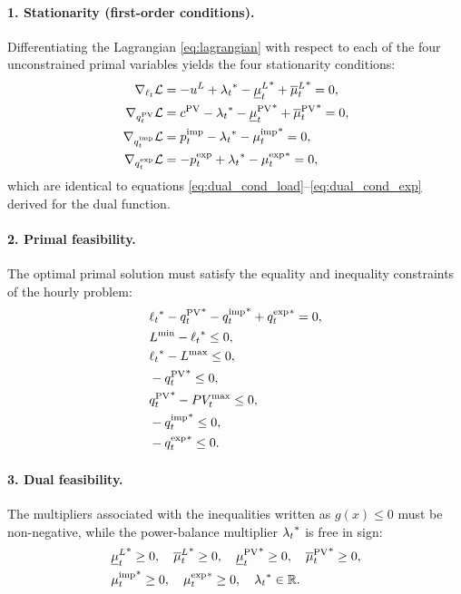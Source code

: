 \paragraph{1. Stationarity (first-order conditions).}
Differentiating the Lagrangian \eqref{eq:lagrangian} with respect to each of the four
unconstrained primal variables yields the four stationarity conditions:
\begin{align}
    \nabla_{\ell_{t}} \mathcal{L} &= -u^{L} + {\lambda_{t}}^* - {\underline{\mu}^{L}_{t}}^* + {\overline{\mu}^{L}_{t}}^* = 0, \label{eq:kkt_stat_load} \\
    \nabla_{q^{\mathrm{PV}}_{t}} \mathcal{L} &= c^{\mathrm{PV}} - {\lambda_{t}}^* - {\underline{\mu}^{\mathrm{PV}}_{t}}^* + {\overline{\mu}^{\mathrm{PV}}_{t}}^* = 0, \label{eq:kkt_stat_pv} \\
    \nabla_{q^{\mathrm{imp}}_{t}} \mathcal{L} &= p^{\mathrm{imp}}_{t} - {\lambda_{t}}^* - {\mu^{\mathrm{imp}}_{t}}^* = 0, \label{eq:kkt_stat_imp} \\
    \nabla_{q^{\mathrm{exp}}_{t}} \mathcal{L} &= -p^{\mathrm{exp}}_{t} + {\lambda_{t}}^* - {\mu^{\mathrm{exp}}_{t}}^* = 0, \label{eq:kkt_stat_exp}
\end{align}
which are identical to equations \eqref{eq:dual_cond_load}--\eqref{eq:dual_cond_exp} derived for
the dual function.

\paragraph{2. Primal feasibility.}
The optimal primal solution must satisfy the equality and inequality constraints of the
hourly problem:
\begin{align}
    & {\ell_{t}}^* - {q^{\mathrm{PV}}_{t}}^* - {q^{\mathrm{imp}}_{t}}^* + {q^{\mathrm{exp}}_{t}}^* = 0, \label{eq:kkt_pf_bal} \\
    & L^{\min} - {\ell_{t}}^* \leq 0, \label{eq:kkt_pf_load_lb} \\
    & {\ell_{t}}^* - L^{\max} \leq 0, \label{eq:kkt_pf_load_ub} \\
    & -{q^{\mathrm{PV}}_{t}}^* \leq 0, \label{eq:kkt_pf_pv_lb} \\
    & {q^{\mathrm{PV}}_{t}}^* - PV_{t}^{\max} \leq 0, \label{eq:kkt_pf_pv_ub} \\
    & -{q^{\mathrm{imp}}_{t}}^* \leq 0, \label{eq:kkt_pf_imp} \\
    & -{q^{\mathrm{exp}}_{t}}^* \leq 0. \label{eq:kkt_pf_exp}
\end{align}

\paragraph{3. Dual feasibility.}
The multipliers associated with the inequalities written as $g(x) \leq 0$ must be
non-negative, while the power-balance multiplier ${\lambda_{t}}^*$ is free in sign:
\begin{align}
    & {\underline{\mu}^{L}_{t}}^* \geq 0, \quad {\overline{\mu}^{L}_{t}}^* \geq 0, \quad {\underline{\mu}^{\mathrm{PV}}_{t}}^* \geq 0, \quad {\overline{\mu}^{\mathrm{PV}}_{t}}^* \geq 0, \label{eq:kkt_df_mu} \\
    & {\mu^{\mathrm{imp}}_{t}}^* \geq 0, \quad {\mu^{\mathrm{exp}}_{t}}^* \geq 0, \quad {\lambda_{t}}^* \in \mathbb{R}. \label{eq:kkt_df_grid}
\end{align}

